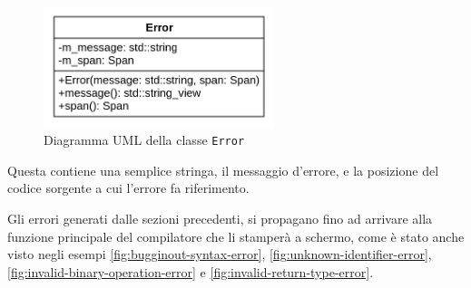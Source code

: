 \begin{figure}[H]
	\centering
	\includegraphics[width=0.6\textwidth]{figures/error.png}
	\caption{Diagramma UML della classe \texttt{Error}}
	\label{fig:error-uml}
\end{figure}

Questa contiene una semplice stringa, il messaggio d'errore, e la posizione del codice sorgente a cui l'errore fa riferimento.

Gli errori generati dalle sezioni precedenti, si propagano fino ad arrivare alla funzione principale del compilatore che li stamper\`a a schermo, come \`e stato anche visto negli esempi \ref{fig:bugginout-syntax-error}, \ref{fig:unknown-identifier-error}, \ref{fig:invalid-binary-operation-error} e \ref{fig:invalid-return-type-error}.
